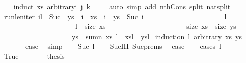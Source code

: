 \begin{isabellebody}
%
\isadelimproof
\ \ %
\endisadelimproof
%
\isatagproof
{}\isamarkupfalse%
\ {\isacharparenleft}induct\ xs\ arbitrary{\isacharcolon}i\ j\ k{\isacharparenright}\isanewline
\ \ \ \isamarkupfalse%
\ {\isacharparenleft}auto\ simp\ add{\isacharcolon}\ nth{\isacharunderscore}Cons\ split{\isacharcolon}\ nat{\isachardot}split{\isacharparenright}\isanewline
\ \ \isamarkupfalse%
%
\endisatagproof
{\isafoldproof}%
%
\isadelimproof
\isanewline
%
\endisadelimproof
\isanewline
\isanewline
{}\isamarkupfalse%
\ run{\isacharunderscore}len{\isacharunderscore}iter{\isacharcolon}\ {\isachardoublequoteopen}{\isasymforall}i{\isacharless}l\ {\isacharminus}\ Suc\ {}{\isachardot}\ ys\ {\isacharbang}\ i\ {\isacharplus}\ xs\ {\isacharbang}\ i\ {\isacharequal}\ ys\ {\isacharbang}\ Suc\ i\ {\isasymLongrightarrow}\isanewline
\ \ \ \ \ \ \ \ \ \ \ \ \ \ \ \ \ \ \ \ \ l\ {\isachargreater}\ {}\ {\isasymLongrightarrow}\isanewline
\ \ \ \ \ \ \ \ \ \ \ \ \ \ \ \ \ \ \ \ \ l\ {\isasymle}\ size\ xs\ {\isasymLongrightarrow}\isanewline
\ \ \ \ \ \ \ \ \ \ \ \ \ \ \ \ \ \ \ \ \ size\ xs\ {\isacharequal}\ size\ ys\ {\isasymLongrightarrow}\isanewline
\ \ \ \ \ \ \ \ \ \ \ \ \ \ \ \ \ \ \ \ ys{\isacharbang}{}\ {\isacharplus}\ sumn\ xs\ l\ {\isacharequal}\ xs{\isacharbang}{\isacharparenleft}l{\isacharminus}{}{\isacharparenright}\ {\isacharplus}\ ys{\isacharbang}{\isacharparenleft}l{\isacharminus}{}{\isacharparenright}{\isachardoublequoteclose}\isanewline
%
\isadelimproof
%
\endisadelimproof
%
\isatagproof
{}\isamarkupfalse%
\ {\isacharparenleft}induction\ l\ arbitrary{\isacharcolon}\ xs\ ys{\isacharparenright}\isanewline
\ \ \isamarkupfalse%
\ {}\isanewline
\ \ \isamarkupfalse%
\ \isamarkupfalse%
\ {\isacharquery}case\ \isamarkupfalse%
\ simp\isanewline
{}\isamarkupfalse%
\isanewline
\ \ \isamarkupfalse%
\ {\isacharparenleft}Suc\ l{\isacharparenright}\isanewline
\ \ \isamarkupfalse%
\ Suc{\isachardot}IH\ Suc{\isachardot}prems\ \isamarkupfalse%
\ {\isacharquery}case\isanewline
\ \ \isamarkupfalse%
\ {\isacharparenleft}cases\ {\isachardoublequoteopen}l{\isacharequal}{}{\isachardoublequoteclose}{\isacharparenright}\isanewline
\ \ \ \ \isamarkupfalse%
\ True\isanewline
\ \ \ \ \isamarkupfalse%
\ \isamarkupfalse%
\ {\isacharquery}thesis\ \isamarkupfalse%

\end{isabellebody}
